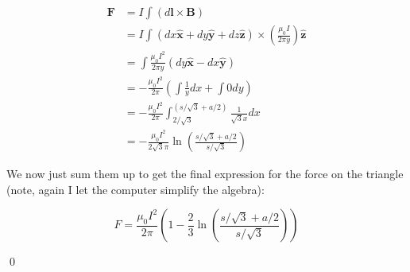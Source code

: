 \documentclass{homework}
\newcommand{\bs}[1]{\ensuremath{\boldsymbol{#1}}}
\newcommand{\bhat}[1]{\ensuremath{\boldsymbol{\hat{#1}}}}
\newcommand{\pfrac}[2]{
    \ensuremath{ \left( \frac{#1}{#2} \right)}
  }
\begin{document}
\begin{homeworkProblem}[Problem 5.10]
{\begin{enumerate}
\begin{enumerate}
          \begin{align*}
            \bs{F} &= I \int (d \bs{l} \times \bs{B}) \\
              &= I \int (dx \bhat{x} + dy \bhat{y} + dz \bhat{z}) \times \pfrac{\mu_0 I}{2 \pi y } \bhat{z} \\
              &= \int \frac{\mu_0 I^2}{2 \pi y} (dy \bhat{x} - dx \bhat{y})\\
              &= - \frac{\mu_0 I^2}{ 2 \pi} \left( \int \frac{1}{y} dx + \int 0 dy\right)\\
              &= - \frac{\mu_0 I^2}{ 2 \pi} \int_{2 / \sqrt{3}}^{(s / \sqrt{3} + a / 2)} \frac{1}{\sqrt{3} x} dx \\
              &= - \frac{\mu_0 I^2}{2 \sqrt{3} \pi} \ln \pfrac{s / \sqrt{3} + a/2}{s / \sqrt{3}}
          \end{align*}
        \end{enumerate}

      We now just sum them up to get the final expression for the force on the triangle (note, again I let the computer simplify the algebra):

      $$F = \frac{\mu_0 I^2}{2 \pi} \left(1 - \frac{2}{3}\ln \pfrac{s / \sqrt{3} + a/2}{s / \sqrt{3}}  \right) $$

    \end{enumerate}

    \qed

  }
\end{homeworkProblem}
\end{document}
